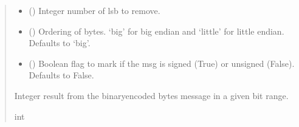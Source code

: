 \documentclass[letterpaper,10pt,english]{sphinxmanual}
\begin{document}
\begin{fulllineitems}
\begin{fulllineitems}
\begin{quote}
\begin{description}
\begin{itemize}
\item {} 
\sphinxAtStartPar
{} () \textendash{} Integer number of lsb to remove.

\item {} 
\sphinxAtStartPar
{} (\sphinxstyleliteralemphasis{\sphinxupquote{, }}) \textendash{} Ordering of bytes. ‘big’ for big endian and ‘little’ for little                 endian. Defaults to ‘big’.

\item {} 
\sphinxAtStartPar
{} (\sphinxstyleliteralemphasis{\sphinxupquote{, }}) \textendash{} Boolean flag to mark if the msg is signed (True) or unsigned (False).                 Defaults to False.

\end{itemize}

\sphinxAtStartPar
Integer result from the binary\sphinxhyphen{}encoded bytes message in a given bit range.

\sphinxAtStartPar
int

\end{description}\end{quote}

\end{fulllineitems}



\end{fulllineitems}
\end{document}

